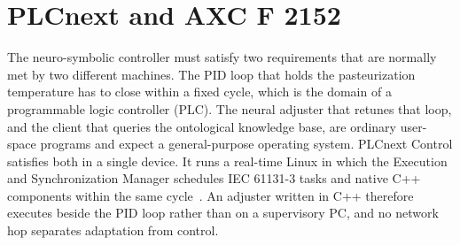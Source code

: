

\section{PLCnext and AXC F 2152}

The neuro-symbolic controller must satisfy two requirements that are normally
met by two different machines. The PID loop that holds the pasteurization
temperature has to close within a fixed cycle, which is the domain of a
programmable logic controller (PLC). The neural adjuster that retunes that loop,
and the client that queries the ontological knowledge base, are ordinary
user-space programs and expect a general-purpose operating system. PLCnext
Control satisfies both in a single device. It runs a real-time Linux in which
the Execution and Synchronization Manager schedules IEC 61131-3 tasks and native
C++ components within the same cycle~\cite{PLCnextControl}. An adjuster written
in C++ therefore executes beside the PID loop rather than on a supervisory PC,
and no network hop separates adaptation from control.

